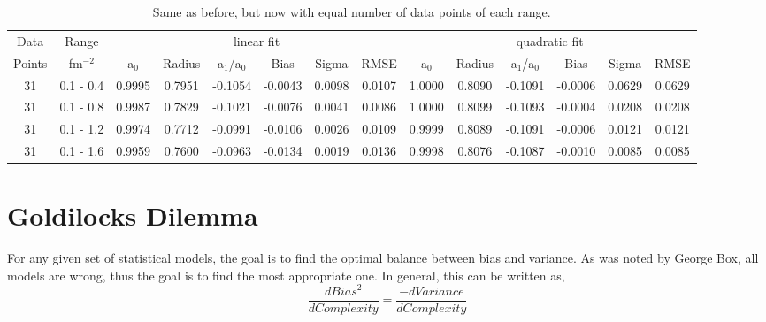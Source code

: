 \documentclass[10pt,aps,prc,twocolumn]{revtex4-1}
\begin{document}
\begin{table}
\caption{Same as before, but now with equal number of data points of each range.}
\begin{tabular}{cc|cccccc|cccccc} \hline
Data   & Range     & \multicolumn{6}{c|}{linear fit}                       & \multicolumn{6}{c}{quadratic fit}                    \\ 
Points & fm$^{-2}$ &   a$_0$  & Radius&  a$_1$/a$_0$ &  Bias  & Sigma &  RMSE  &   a$_0$  & Radius& a$_1$/a$_0$  &  Bias  & Sigma &  RMSE \\  \hline
31& 0.1 - 0.4 & 0.9995& 0.7951& -0.1054& -0.0043& 0.0098& 0.0107 & 1.0000& 0.8090& -0.1091& -0.0006& 0.0629& 0.0629 \\
31& 0.1 - 0.8 & 0.9987& 0.7829& -0.1021& -0.0076& 0.0041& 0.0086 & 1.0000& 0.8099& -0.1093& -0.0004& 0.0208& 0.0208  \\
31& 0.1 - 1.2 & 0.9974& 0.7712& -0.0991& -0.0106& 0.0026& 0.0109 & 0.9999& 0.8089& -0.1091& -0.0006& 0.0121& 0.0121  \\
31& 0.1 - 1.6 & 0.9959& 0.7600& -0.0963& -0.0134& 0.0019& 0.0136 & 0.9998& 0.8076& -0.1087& -0.0010& 0.0085& 0.0085  \\  \hline
\end{tabular}
\label{equaldatatable}
\end{table}

\section{Goldilocks Dilemma}

For any given set of statistical models, the goal is to find the optimal balance between bias and variance.   
As was noted by George Box, all models are wrong, thus the goal is to find the most appropriate one. 
In general, this can be written as,
\begin{equation}
\frac{d Bias^2 }{ d Complexity} = \frac{- d Variance }{ d Complexity }
\end{equation}
\end{document}
